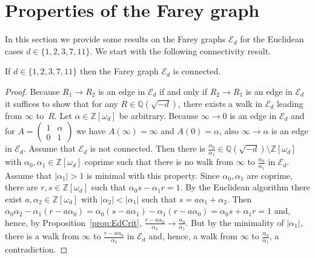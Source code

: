 \documentclass[graybox]{svmult}
\begin{document}
\section{Properties of the Farey graph}

In this section we provide some results on the Farey graphs $\mathcal E_{d}$ for the Euclidean cases $d\in\{1,2,3,7,11\}$. We start with the following connectivity result.

\begin{proposition}
If $d\in\{1,2,3,7,11\}$ then the Farey graph $\mathcal E_{d}$ is connected.  
\end{proposition}

\begin{proof}  Because $R_1\to R_2$ is an edge in $\mathcal{E}_{d}$ if and only if $R_2\to R_1$ is an edge in $\mathcal{E}_{d}$ it suffices to show that for any $R \in \mathbb Q(\sqrt{-d})$, there exists a walk in $\mathcal E_{d}$ leading from $\infty$ to~$R$. Let $\alpha\in \mathbb{Z}[\omega_d]$ be arbitrary. Because $\infty \to 0$ is an edge in $\mathcal{E}_{d}$ and for $A = \begin{pmatrix} 1 & \alpha \\ 0 & 1\end{pmatrix}$ we have $A(\infty) = \infty$ and  $A(0) = \alpha$, 
also $\infty \to \alpha$ is an edge in $\mathcal{E}_{d}$.  Assume that $\mathcal E_{d}$ is not connected. Then there is $\frac{\alpha_{0}}{\alpha_{1}} \in \mathbb Q(\sqrt{-d})\setminus \mathbb{Z}[\omega_d]$ with $\alpha_0,\alpha_1\in\mathbb{Z}[\omega_d]$ coprime such that there is no walk from $\infty$ to $\frac{\alpha_{0}}{\alpha_{1}}$ in $\mathcal{E}_d$. Assume that $|\alpha_1|>1$ is minimal with this property. Since $\alpha_0,\alpha_1$ are coprime, there are $r,s\in \mathbb{Z}[\omega_d]$ such that $\alpha_0s - \alpha_1 r=1$. By the Euclidean algorithm there exist $a,\alpha_2\in \mathbb{Z}[\omega_d]$ with $|\alpha_2| < |\alpha_1|$ such that $s=a\alpha_1+\alpha_2$. Then $\alpha_0 \alpha_2 - \alpha_1(r-a \alpha_0)=\alpha_0 (s-a\alpha_1) - \alpha_1(r-a \alpha_0)=\alpha_0s + \alpha_1 r=1$ and, hence,  by Proposition~\ref{prop:EdCrit}, $\frac{r-a\alpha_0}{\alpha_2} \to \frac{\alpha_{0}}{\alpha_{1}}$. But by the minimality of $|\alpha_1|$,  there is a walk from $\infty$ to $\frac{r-a\alpha_0}{\alpha_2}$ in $\mathcal{E}_d$ and, hence, a walk from $\infty$ to $\frac{\alpha_{0}}{\alpha_{1}}$, a contradiction.
\end{proof}
\end{document}
